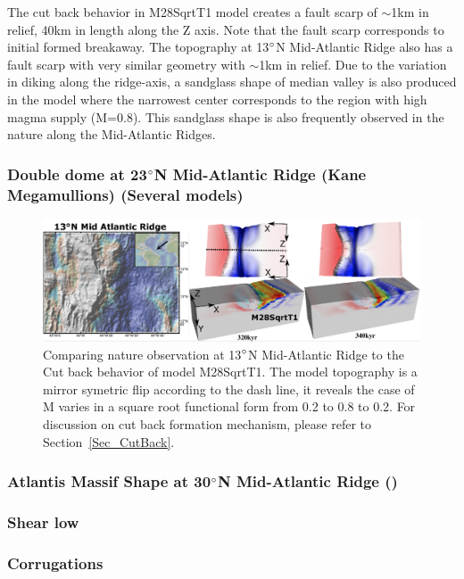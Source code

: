 The cut back behavior in M28SqrtT1 model creates a fault scarp of $\sim$1km in relief, 40km in length along the Z axis. Note that the fault scarp corresponds to initial formed breakaway. The topography at 13$\degree$N Mid-Atlantic Ridge also has a fault scarp with very similar geometry with $\sim$1km in relief. Due to the variation in diking along the ridge-axis, a sandglass shape of median valley is also produced in the model where the narrowest center corresponds to the region with high magma supply (M=$0.8$). This sandglass shape is also frequently observed in the nature along the Mid-Atlantic Ridges.
 
\subsubsection{Double dome at 23$\degree$N Mid-Atlantic Ridge (Kane Megamullions) (Several models)}

\begin{figure}[h]
 \centering
  \includegraphics[width=1.0\textwidth]{./Figures/fig_Discussion_Observation_1_13N_MAR_CutBack.eps}
 \caption{Comparing nature observation at 13$\degree$N Mid-Atlantic Ridge to the Cut back behavior of model M28SqrtT1. The model topography is a mirror symetric flip according to the dash line, it reveals the case of M varies in a square root functional form from 0.2 to 0.8 to 0.2. For discussion on cut back formation mechanism, please refer to Section~\hyperref[Sec_CutBack]{\ref{Sec_CutBack}}.}
 \label{fig_Discussion_Observation_1}
\end{figure}

\subsubsection{Atlantis Massif Shape at 30$\degree$N Mid-Atlantic Ridge ()}
\subsubsection{Shear low}
\subsubsection{Corrugations}


